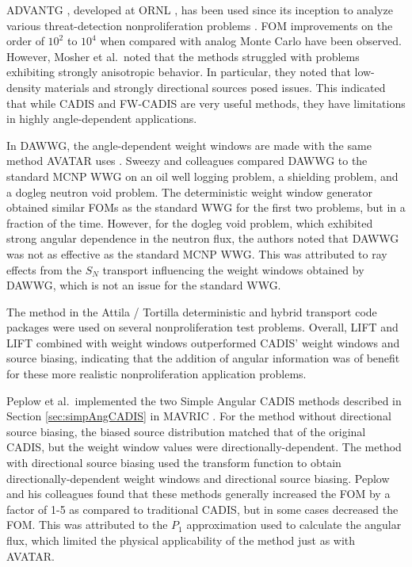 ADVANTG \cite{mosher_automated_2009}, developed at ORNL \cite{mosher_new_2010,
wagner_review_2011, bevill_new_2012}, has been used since its inception
to analyze various threat-detection nonproliferation problems
\cite{mosher_automated_2009}. FOM improvements on the order of $10^2$
to $10^4$ when compared with analog Monte Carlo have been observed. However, Mosher et al.\ noted
that the methods struggled with problems exhibiting strongly anisotropic
behavior. In particular, they noted that low-density materials and strongly
directional sources posed issues. This indicated that while CADIS and FW-CADIS
are very useful methods, they have limitations in highly angle-dependent
applications.

In DAWWG, the angle-dependent weight windows are made with the same
method AVATAR uses \cite{sweezy_automated_2005, van_riper_generation_1995}.
Sweezy and colleagues compared
DAWWG to the standard MCNP WWG on an oil well logging problem, a shielding
problem, and a dogleg neutron void problem. The deterministic weight window
generator obtained similar FOMs as the standard WWG for the first two problems,
but in a fraction of the time.
 However, for the dogleg void problem, which
exhibited strong angular dependence in the neutron flux,
the authors noted that DAWWG was not as effective as the
standard MCNP WWG. This was attributed to ray effects from the $S_N$ transport
influencing the weight windows obtained by DAWWG, which is not an issue for the
standard WWG.

The method in the Attila / Tortilla deterministic and hybrid transport
code packages 
were used on several
nonproliferation test problems. Overall, LIFT and LIFT combined with
weight windows outperformed CADIS' weight windows and source biasing, indicating
that the addition of angular information was of benefit for these more realistic
nonproliferation application
problems.

Peplow et al.\ implemented the two Simple Angular CADIS methods described in Section \ref{sec:simpAngCADIS} in MAVRIC \cite{peplow_consistent_2012}. For the method without
directional source biasing, the biased source distribution matched that of the
original CADIS, but the weight window values were directionally-dependent. The
method with directional source biasing used the transform function to obtain
directionally-dependent weight windows and directional source biasing.
Peplow and his colleagues found
that these methods generally increased the FOM by a factor of 1-5 as compared to
traditional CADIS, but in some
cases decreased the FOM. This was attributed to the $P_1$ approximation used
to calculate the angular flux, which limited the physical applicability of the
method just as with AVATAR.


